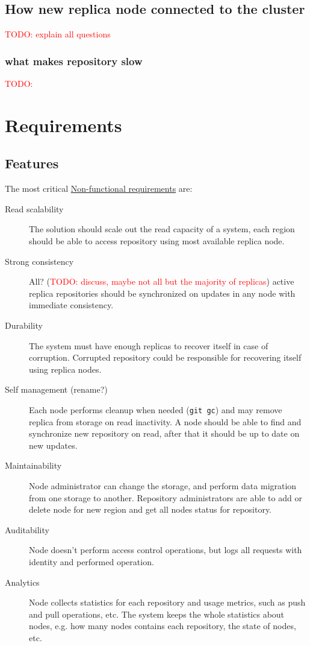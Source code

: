 \documentclass[nonacm=true]{acmart}
\newcommand{\code}[1]{\texttt{#1}}
\newcommand{\todo}[1]{\textcolor{red}{TODO: #1}}
\begin{document}
\subsection{How new replica node connected to the cluster}

\todo{explain all questions}


\subsubsection{what makes repository slow}

\todo{}

\section{Requirements}
\label{sec:requirements}

\subsection{Features}
\label{sec:features}

The most critical
\href{https://en.wikipedia.org/wiki/Non-functional_requirement}{Non-functional requirements}
are:

\begin{description}
  \item[Read scalability]
    The solution should scale out the read capacity of a system, each region should be able
    to access repository using most available replica node.
  \item[Strong consistency]
    All? (\todo{discuss, maybe not all but the majority of replicas})
    active replica repositories should be synchronized on updates in any node
    with immediate consistency.
  \item[Durability]
    The system must have enough replicas to recover itself in case of corruption.
    Corrupted repository could be responsible for recovering itself using replica nodes.
  \item[Self management (rename?)]
    Each node performs cleanup when needed (\code{git gc}) and may remove replica
    from storage on read inactivity.
    A node should be able to find and synchronize new repository on read,
    after that it should be up to date on new updates.
  \item[Maintainability]
    Node administrator can change the storage, and perform data migration from one storage
    to another.
    Repository administrators are able to add or delete node for new region and
    get all nodes status for repository.
  \item[Auditability]
    Node doesn't perform access control operations, but logs all
    requests with identity and performed operation.
  \item[Analytics]
    Node collects statistics for each repository and usage metrics, such as
    push and pull operations, etc. The system keeps the whole statistics about
    nodes, e.g. how many nodes contains each repository, the state of nodes, etc.
\end{description}
\end{document}
